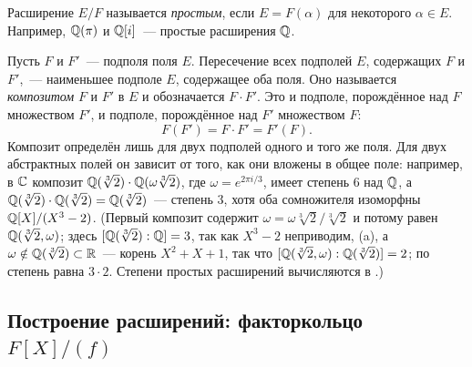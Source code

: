 Расширение $E/F$ называется \emph{простым}, если $E=F(\alpha)$ для некоторого $\alpha\in E$. Например, $\mathbb Q(\pi)$ и
$\mathbb Q[i]$~--- простые расширения $\mathbb Q$.

Пусть $F$ и $F'$~--- подполя поля $E$. Пересечение всех подполей $E$, содержащих $F$ и $F'$,~--- наименьшее подполе $E$,
содержащее оба поля. Оно называется \emph{композитом} $F$ и $F'$ в $E$ и обозначается $F\cdot F'$. Это и подполе,
порождённое над $F$ множеством $F'$, и подполе, порождённое над $F'$ множеством $F$:
\[
F(F')=F\cdot F'=F'(F).
\]
Композит определён лишь для двух подполей одного и того же поля. Для двух абстрактных полей он зависит от того, как они
вложены в общее поле: например, в $\mathbb C$ композит $\mathbb Q(\sqrt[3]2)\cdot\mathbb Q(\omega\sqrt[3]2)$, где $\omega=e^{2\pi i/3}$, имеет
степень $6$ над $\mathbb Q$, а $\mathbb Q(\sqrt[3]2)\cdot\mathbb Q(\sqrt[3]2)=\mathbb Q(\sqrt[3]2)$~--- степень $3$, хотя оба сомножителя изоморфны
$\mathbb Q[X]/(X^3-2)$. (Первый композит содержит $\omega=\omega\sqrt[3]2/\sqrt[3]2$ и потому равен $\mathbb Q(\sqrt[3]2,\omega)$; здесь
$[\mathbb Q(\sqrt[3]2):\mathbb Q]=3$, так как $X^3-2$ неприводим, (a), а $\omega\notin\mathbb Q(\sqrt[3]2)\subset\mathbb R$~--- корень
$X^2+X+1$, так что $[\mathbb Q(\sqrt[3]2,\omega):\mathbb Q(\sqrt[3]2)]=2$; по  степень равна $3\cdot2$. Степени простых
расширений вычисляются в .)

\subsection*{Построение расширений: факторкольцо $F[X]/(f)$}

